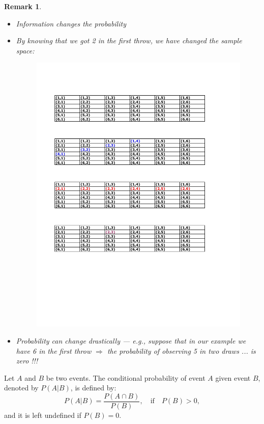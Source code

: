 \documentclass[notes=show,handout]{beamer}\usepackage[]{graphicx}\usepackage[]{color}
\newtheorem{remark}{Remark}[section]
\begin{document}
\begin{frame}{\secname}
  \begin{remark}
  \begin{itemize}
  \item Information changes the probability
  \item By knowing that we got 2 in the first throw, we have changed the sample space:
  \begin{figure}[h!]
  \centering
  \includegraphics[scale=0.65]{img/c3.pdf}
  \end{figure}
  \item Probability can change drastically --- e.g., suppose that in our example we have 6 in the first throw $\Rightarrow$ the probability of
  observing 5 in two draws ... is zero !!!
  \end{itemize}
  \end{remark}
\end{frame}

\begin{frame}{\secname}

  \begin{definition}
  Let $A$ and $B$ be two events. The conditional probability of event $A$
  given event $B$, denoted by $P\left(A\vert B\right)$, is defined by:
  $$
  P\left(A\vert B\right) = \frac{P(A \cap B)}{P(B)}, \quad \text{if} \quad P(B) >0,
  $$
  and it is left undefined if $P(B)=0$.
  \end{definition}
\end{frame}
\end{document}
